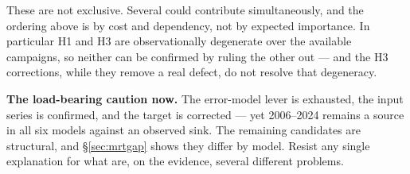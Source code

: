 \documentclass[11pt]{article}
\begin{document}
\begin{caveat}
These are not exclusive. Several could contribute simultaneously, and the ordering above is by cost
and dependency, not by expected importance. In particular H1 and H3 are observationally degenerate
over the available campaigns, so neither can be confirmed by ruling the other out --- and the H3
corrections, while they remove a real defect, do not resolve that degeneracy.

\smallskip
\textbf{The load-bearing caution now.} The error-model lever is exhausted, the input series is
confirmed, and the target is corrected --- yet 2006--2024 remains a source in all six models against
an observed sink. The remaining candidates are structural, and \S\ref{sec:mrtgap} shows they differ by model. Resist
any single explanation for what are, on the evidence, several different problems.
\end{caveat}
\end{document}

